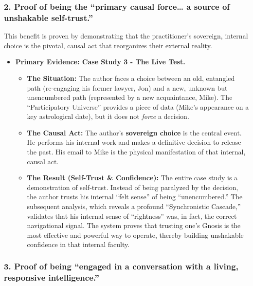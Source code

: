 \documentclass{article}
\begin{document}
\subsubsection*{2. Proof of being the ``primary causal force\ldots{} a
source of unshakable
self-trust.''}\label{proof-of-being-the-primary-causal-force-a-source-of-unshakable-self-trust.}

This benefit is proven by demonstrating that the practitioner's
sovereign, internal choice is the pivotal, causal act that reorganizes
their external reality.

\begin{itemize}
\tightlist
\item
  \textbf{Primary Evidence: Case Study 3 - The Live Test.}

  \begin{itemize}
  \tightlist
  \item
    \textbf{The Situation:} The author faces a choice between an old,
    entangled path (re-engaging his former lawyer, Jon) and a new,
    unknown but unencumbered path (represented by a new acquaintance,
    Mike). The ``Participatory Universe'' provides a piece of data
    (Mike's appearance on a key astrological date), but it does not
    \emph{force} a decision.
  \item
    \textbf{The Causal Act:} The author's \textbf{sovereign choice} is
    the central event. He performs his internal work and makes a
    definitive decision to release the past. His email to Mike is the
    physical manifestation of that internal, causal act.
  \item
    \textbf{The Result (Self-Trust \& Confidence):} The entire case
    study is a demonstration of self-trust. Instead of being paralyzed
    by the decision, the author trusts his internal ``felt sense'' of
    being ``unencumbered.'' The subsequent analysis, which reveals a
    profound ``Synchronistic Cascade,'' validates that his internal
    sense of ``rightness'' was, in fact, the correct navigational
    signal. The system proves that trusting one's Gnosis is the most
    effective and powerful way to operate, thereby building unshakable
    confidence in that internal faculty.
  \end{itemize}
\end{itemize}

\subsubsection*{3. Proof of being ``engaged in a conversation with a
living, responsive
intelligence.''}\label{proof-of-being-engaged-in-a-conversation-with-a-living-responsive-intelligence.}
\end{document}
